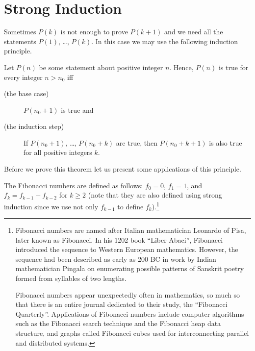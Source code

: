 \chapter{Strong Induction}
\label{chapter:strong-induction}
Sometimes $P(k)$ is not enough to prove $P(k + 1)$ and we need all the
statements $P(1)$, \dots, $P(k)$. In this case we may use the following
induction  principle.

\begin{theorem}
\label{theorem:strong-induction}
    Let $P(n)$ be some statement about positive integer $n$.
    Hence, $P(n)$ is true for every integer $n > n_0$ iff
    \begin{description}
        \item [(the base case)] $P(n_0 + 1)$ is true and
        \item [(the induction step)] If $P(n_0 + 1)$, \dots, $P(n_0 + k)$ are true,
            then $P(n_0 + k + 1)$ is also true for all positive integers $k$.
  \end{description}
\end{theorem}

Before we prove this theorem let us present some applications of this
principle.

The Fibonacci numbers are defined as follows:
$f_0 = 0$, $f_1 = 1$, and $f_k = f_{k - 1} + f_{k - 2}$ for $k \ge 2$ (note
that they are also defined using strong induction since we use not only
$f_{k - 1}$ to define $f_k$).\footnote{%
  Fibonacci numbers are named after Italian mathematician Leonardo of Pisa,
  later known as Fibonacci. In his 1202 book ``Liber Abaci'', Fibonacci
  introduced the sequence to Western European mathematics. However, the sequence
  had been described as early as 200 BC in work by Indian mathematician Pingala
  on enumerating possible patterns of Sanskrit poetry formed from syllables of
  two lengths.
  
  Fibonacci numbers appear unexpectedly often in mathematics, so much so that
  there is an entire journal dedicated to their study, the ``Fibonacci
  Quarterly''. Applications of Fibonacci numbers include computer algorithms
  such as the Fibonacci search technique and the Fibonacci heap data structure,
  and graphs called Fibonacci cubes used for interconnecting parallel and
  distributed systems.
}

